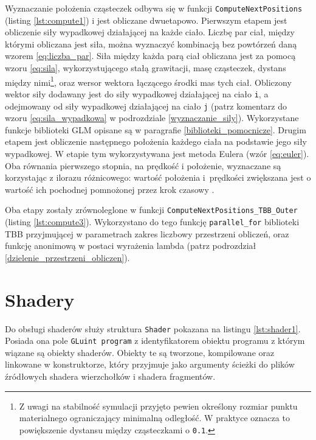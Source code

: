 \documentclass[12pt, twoside, openany]{report}
\begin{document}
Wyznaczanie położenia cząsteczek odbywa się w funkcji \texttt{ComputeNextPositions} (listing \ref{lst:compute1}) i jest obliczane dwuetapowo. Pierwszym etapem jest obliczenie siły wypadkowej działającej na każde ciało. Liczbę par ciał, między którymi obliczana jest siła, można wyznaczyć kombinacją bez powtórzeń daną wzorem \ref{eq:liczba_par}. Siła między każda parą ciał obliczana jest za pomocą wzoru \ref{eq:sila}, wykorzystującego stałą grawitacji, masę cząsteczek, dystans między nimi\footnote{Z uwagi na stabilność symulacji przyjęto pewien określony rozmiar punktu materialnego ograniczający minimalną odległość. W praktyce oznacza to powiększenie dystansu między cząsteczkami o \texttt{0.1}.}, oraz wersor wektora łączącego środki mas tych ciał. Obliczony wektor siły dodawany jest do siły wypadkowej działającej na ciało \texttt i, a odejmowany od siły wypadkowej działającej na ciało \texttt j (patrz komentarz do wzoru \ref{eq:sila_wypadkowa} w podrozdziale \ref{wyznaczanie_sily}). Wykorzystane funkcje biblioteki GLM opisane są w paragrafie \ref{biblioteki_pomocnicze}. Drugim etapem jest obliczenie następnego położenia każdego ciała na podstawie jego siły wypadkowej. W etapie tym wykorzystywana jest metoda Eulera (wzór \ref{eq:euler}). Oba równania pierwszego stopnia, na prędkość i położenie, wyznaczane są korzystając z ilorazu różnicowego: wartość położenia i~prędkości zwiększana jest o wartość ich pochodnej pomnożonej przez krok czasowy \cite{bib:dziubak}.



Oba etapy zostały zrównoleglone w funkcji \texttt{ComputeNextPositions\_TBB\_Outer} (listing \ref{lst:compute3}). Wykorzystano do tego funkcję \texttt{parallel\_for} biblioteki TBB przyjmującej w parametrach zakres liczbowy przestrzeni obliczeń, oraz funkcję anonimową w postaci wyrażenia lambda (patrz podrozdział \ref{dzielenie_przestrzeni_obliczen}).



\section{Shadery}

Do obsługi shaderów służy struktura \texttt{Shader} pokazana na listingu \ref{lst:shader1}. Posiada ona pole \texttt{GLuint program} z identyfikatorem obiektu programu z którym wiązane są obiekty shaderów. Obiekty te są tworzone, kompilowane oraz linkowane w konstruktorze, który przyjmuje jako argumenty ścieżki do plików źródłowych shadera wierzchołków i shadera fragmentów.
\end{document}
